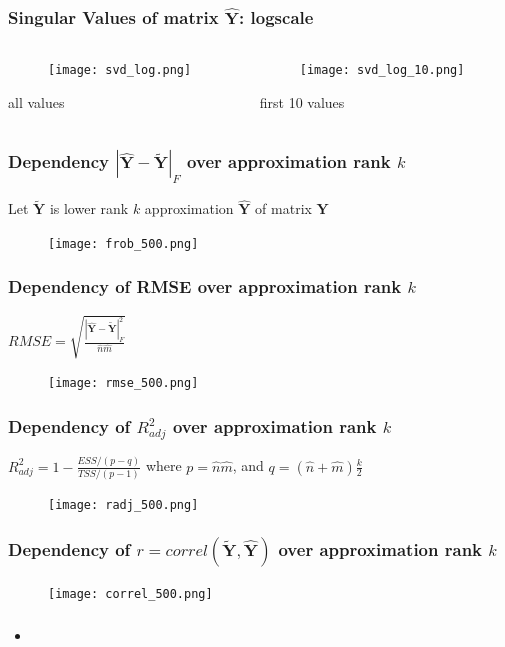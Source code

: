\documentclass{beamer}
\newcommand{\mY}{\mathbf{Y}}
\begin{document}
\begin{frame}
\frametitle{Singular Values of matrix $\hat{\mY}$: logscale}
\begin{columns}[T] %
\begin{column}{.48\textwidth}
\begin{figure}[h] 
    \texttt{[image: svd\_log.png]}
\end{figure}
all values
\end{column}%
\hfill%
\begin{column}{.48\textwidth}
\begin{figure}[h] 
    \texttt{[image: svd\_log\_10.png]}
\end{figure}
first 10 values
\end{column}%
\end{columns}
\end{frame}

\begin{frame}
\frametitle{Dependency $|\hat{\mY} - \tilde{\mY}|_F$ over approximation rank
$k$}
Let $\tilde{\mY}$ is lower rank $k$ approximation $\hat{\mY}$ of matrix $\mY$
\begin{figure}[h] 
    \texttt{[image: frob\_500.png]}
\end{figure}
\end{frame}

\begin{frame}
\frametitle{Dependency of RMSE over approximation rank
$k$}
$RMSE = \sqrt{\frac{|\hat{\mY} - \tilde{\mY}|_F^2}{\hat{n} \hat{m}}}$
\begin{figure}[h] 
    \texttt{[image: rmse\_500.png]}
\end{figure}
\end{frame}

\begin{frame}
\frametitle{Dependency of $R^2_{adj}$ over approximation rank $k$}
$R_{adj}^2 = 1 - \frac{ESS / (p-q)}{TSS / (p-1)}$ where $p = \hat{n} \hat{m}$,
 and $q = (\hat{n} + \hat{m}) \frac{k}{2}$
\begin{figure}[h] 
    \texttt{[image: radj\_500.png]}
\end{figure}
\end{frame}

\begin{frame}
\frametitle{Dependency of $r = correl(\tilde{\mY}, \hat{\mY})$ over
approximation rank $k$}
\begin{figure}[h] 
    \texttt{[image: correl\_500.png]}
\end{figure}
\end{frame}

\begin{frame}[allowframebreaks]


\end{frame}

\begin{frame}
\frametitle{}
\framesubtitle{}
\begin{itemize}
  \item 
\end{itemize}
\end{frame}
\end{document}
